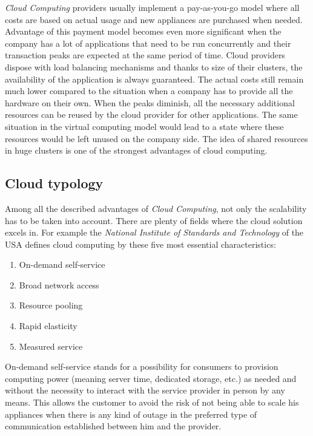 \emph{Cloud Computing} providers usually implement a pay-as-you-go model where all costs are based on actual usage and new appliances are purchased when needed. Advantage of this payment model becomes even more significant when the company has a lot of applications that need to be run concurrently and their transaction peaks are expected at the same period of time. Cloud providers dispose with load balancing mechanisms and thanks to size of their clusters, the availability of the application is always guaranteed. The actual costs still remain much lower compared to the situation when a company has to provide all the hardware on their own. When the peaks diminish, all the necessary additional resources can be reused by the cloud provider for other applications. The same situation in the virtual computing model would lead to a state where these resources would be left unused on the company side. The idea of shared resources in huge clusters is one of the strongest advantages of cloud computing.

\subsection{Cloud typology}
\label{sub:Cloud typology}

Among all the described advantages of \emph{Cloud Computing}, not only the scalability has to be taken into account. There are plenty of fields where the cloud solution excels in. For example the \emph{National Institute of Standards and Technology} of the USA defines cloud computing by these five most essential characteristics\cite{hu}:

\begin{enumerate}
	\item On-demand self-service
	\item Broad network access
	\item Resource pooling
	\item Rapid elasticity
	\item Measured service
\end{enumerate}

On-demand self-service stands for a possibility for consumers to provision computing power (meaning server time, dedicated storage, etc.) as needed and without the necessity to interact with the service provider in person by any means. This allows the customer to avoid the risk of not being able to scale his appliances when there is any kind of outage in the preferred type of communication established between him and the provider.

